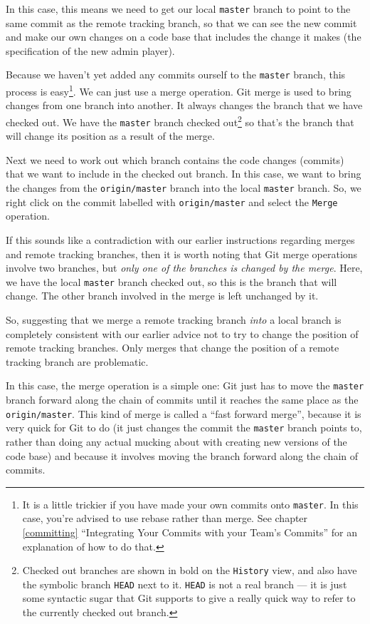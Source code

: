 \documentclass[
]{book}
\begin{document}
In this case, this means we need to get our local \texttt{master} branch to point to the same commit as the remote tracking branch, so that we can see the new commit and make our own changes on a code base that includes the change it makes (the specification of the new admin player).

Because we haven't yet added any commits ourself to the \texttt{master} branch, this process is easy\footnote{It is a little trickier if you have made your own commits onto \texttt{master}. In this case, you're advised to use rebase rather than merge. See chapter \ref{committing} ``Integrating Your Commits with your Team's Commits'' for an explanation of how to do that.}. We can just use a merge operation. Git merge is used to bring changes from one branch into another. It always changes the branch that we have checked out. We have the \texttt{master} branch checked out\footnote{Checked out branches are shown in bold on the \texttt{History} view, and also have the symbolic branch \texttt{HEAD} next to it. \texttt{HEAD} is not a real branch --- it is just some syntactic sugar that Git supports to give a really quick way to refer to the currently checked out branch.} so that's the branch that will change its position as a result of the merge.

Next we need to work out which branch contains the code changes (commits) that we want to include in the checked out branch. In this case, we want to bring the changes from the \texttt{origin/master} branch into the local \texttt{master} branch. So, we right click on the commit labelled with \texttt{origin/master} and select the \texttt{Merge} operation.

If this sounds like a contradiction with our earlier instructions regarding merges and remote tracking branches, then it is worth noting that Git merge operations involve two branches, but \emph{only one of the branches is changed by the merge}. Here, we have the local \texttt{master} branch checked out, so this is the branch that will change. The other branch involved in the merge is left unchanged by it.

So, suggesting that we merge a remote tracking branch \emph{into} a local branch is completely consistent with our earlier advice not to try to change the position of remote tracking branches. Only merges that change the position of a remote tracking branch are problematic.

In this case, the merge operation is a simple one: Git just has to move the \texttt{master} branch forward along the chain of commits until it reaches the same place as the \texttt{origin/master}. This kind of merge is called a ``fast forward merge'', because it is very quick for Git to do (it just changes the commit the \texttt{master} branch points to, rather than doing any actual mucking about with creating new versions of the code base) and because it involves moving the branch forward along the chain of commits.
\end{document}
